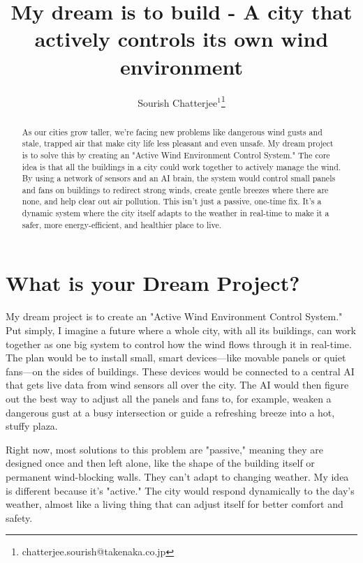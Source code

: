 \documentclass{article}
\title{My dream is to build - A city that actively controls its own wind environment}
\author{
Sourish Chatterjee$^1$\footnote{chatterjee.sourish@takenaka.co.jp}}
\begin{document}
\maketitle

\begin{abstract}
As our cities grow taller, we're facing new problems like dangerous wind gusts and stale, trapped air that make city life less pleasant and even unsafe. My dream project is to solve this by creating an "Active Wind Environment Control System." The core idea is that all the buildings in a city could work together to actively manage the wind. By using a network of sensors and an AI brain, the system would control small panels and fans on buildings to redirect strong winds, create gentle breezes where there are none, and help clear out air pollution. This isn't just a passive, one-time fix. It's a dynamic system where the city itself adapts to the weather in real-time to make it a safer, more energy-efficient, and healthier place to live.
\end{abstract}

\section{What is your Dream Project?}
My dream project is to create an "Active Wind Environment Control System." Put simply, I imagine a future where a whole city, with all its buildings, can work together as one big system to control how the wind flows through it in real-time. The plan would be to install small, smart devices—like movable panels or quiet fans—on the sides of buildings. These devices would be connected to a central AI that gets live data from wind sensors all over the city. The AI would then figure out the best way to adjust all the panels and fans to, for example, weaken a dangerous gust at a busy intersection or guide a refreshing breeze into a hot, stuffy plaza.
\par
Right now, most solutions to this problem are "passive," meaning they are designed once and then left alone, like the shape of the building itself or permanent wind-blocking walls. They can't adapt to changing weather. My idea is different because it's "active." The city would respond dynamically to the day's weather, almost like a living thing that can adjust itself for better comfort and safety.
\end{document}
